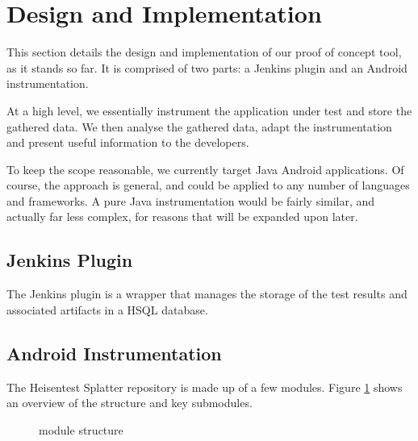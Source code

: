 \section{Design and Implementation}
\label{sec:imp}

This section details the design and implementation of our proof of concept tool, as it stands so far. It is comprised of two parts: a Jenkins plugin and an Android instrumentation.

At a high level, we essentially instrument the application under test and store the gathered data. We then analyse the gathered data, adapt the instrumentation and present useful information to the developers.

To keep the scope reasonable, we currently target Java Android applications. Of course, the approach is general, and could be applied to any number of languages and frameworks. A pure Java instrumentation would be fairly similar, and actually far less complex, for reasons that will be expanded upon later.


\subsection{Jenkins Plugin}

The Jenkins plugin is a wrapper that manages the storage of the test results and associated artifacts in a HSQL database.


\subsection{Android Instrumentation}

The Heisentest Splatter repository\cite{heisentestInstrumentation} is made up of a few modules. Figure \ref{fig:repo_structure} shows an overview of the structure and key submodules.

\begin{figure}[h]
\caption{\heisentest{} module structure}
\label{fig:repo_structure}
\end{figure}

